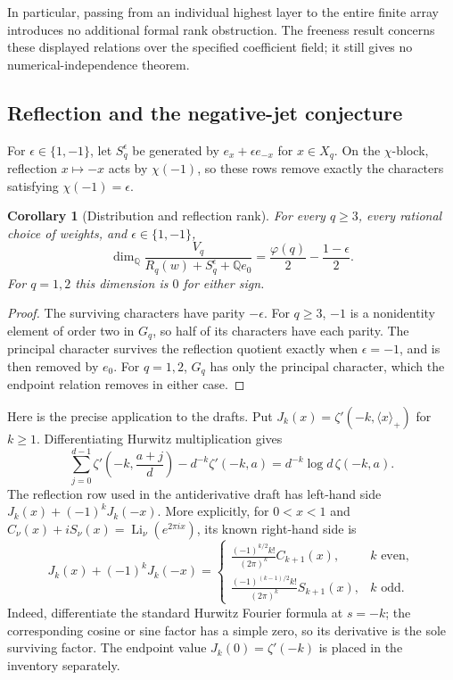 \documentclass[11pt,a4paper]{article}
\newtheorem{corollary}[theorem]{Corollary}
\theoremstyle{definition}
\theoremstyle{remark}
\numberwithin{equation}{section}
\begin{document}
In particular, passing from an individual highest layer to the entire
finite array introduces no additional formal rank obstruction.  The
freeness result concerns these displayed relations over the specified
coefficient field; it still gives no numerical-independence theorem.

\subsection{Reflection and the negative-jet conjecture}

For $\epsilon\in\{1,-1\}$, let $S_q^\epsilon$ be generated by
$e_x+\epsilon e_{-x}$ for $x\in X_q$.  On the $\chi$-block, reflection
$x\mapsto-x$ acts by $\chi(-1)$, so these rows remove exactly the
characters satisfying $\chi(-1)=\epsilon$.

\begin{corollary}[Distribution and reflection rank]\label{rank:reflection}
For every $q\geq3$, every rational choice of weights, and
$\epsilon\in\{1,-1\}$,
\begin{equation}\label{rank:reflection-dimension}
 \dim_{\mathbb Q}
 \frac{V_q}{R_q(w)+S_q^\epsilon+\mathbb Q e_0}
 =\frac{\varphi(q)}2-\frac{1-\epsilon}{2}.
\end{equation}
For $q=1,2$ this dimension is $0$ for either sign.
\end{corollary}
\begin{proof}
The surviving characters have parity $-\epsilon$.  For $q\geq3$,
$-1$ is a nonidentity element of order two in $G_q$, so half of its
characters have each parity.  The principal character survives the
reflection quotient exactly when $\epsilon=-1$, and is then removed
by $e_0$.  For $q=1,2$, $G_q$ has only the principal character, which
the endpoint relation removes in either case.
\end{proof}

Here is the precise application to the drafts.  Put
$J_k(x)=\zeta'(-k,\langle x\rangle_+)$ for $k\geq1$.  Differentiating
Hurwitz multiplication gives
\begin{equation}\label{rank:jet-distribution}
 \sum_{j=0}^{d-1}\zeta'\left(-k,\frac{a+j}{d}\right)
 -d^{-k}\zeta'(-k,a)
 =d^{-k}\log d\,\zeta(-k,a).
\end{equation}
The reflection row used in the antiderivative draft has left-hand side
$J_k(x)+(-1)^kJ_k(-x)$.  More explicitly, for $0<x<1$ and
$C_\nu(x)+iS_\nu(x)=\operatorname{Li}_{\nu}(e^{2\pi i x})$, its known
right-hand side is
\begin{equation}\label{rank:jet-reflection}
 J_k(x)+(-1)^kJ_k(-x)
 =\begin{cases}
  \displaystyle\frac{(-1)^{k/2}k!}{(2\pi)^k}C_{k+1}(x),&k\text{ even},\\[6pt]
  \displaystyle\frac{(-1)^{(k-1)/2}k!}{(2\pi)^k}S_{k+1}(x),&k\text{ odd}.
 \end{cases}
\end{equation}
Indeed, differentiate the standard Hurwitz Fourier formula at $s=-k$;
the corresponding cosine or sine factor has a simple zero, so its
derivative is the sole surviving factor.  The endpoint value
$J_k(0)=\zeta'(-k)$ is placed in the inventory separately.
\end{document}

